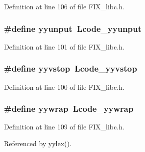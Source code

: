 Definition at line 106 of file FIX\_\-libc.h.
\subsubsection{\setlength{\rightskip}{0pt plus 5cm}\#define yyunput~Lcode\_\-yyunput}\label{FIX__libc_8h_5932d5d9168145d7af38eb53eb894347}




Definition at line 101 of file FIX\_\-libc.h.
\subsubsection{\setlength{\rightskip}{0pt plus 5cm}\#define \bf{yyvstop}~Lcode\_\-yyvstop}\label{FIX__libc_8h_9ca02f47c15552d622ca2eb1861eae31}




Definition at line 100 of file FIX\_\-libc.h.
\subsubsection{\setlength{\rightskip}{0pt plus 5cm}\#define yywrap~Lcode\_\-yywrap}\label{FIX__libc_8h_5be541efdb129f7cefb2437f52fe7359}




Definition at line 109 of file FIX\_\-libc.h.

Referenced by yylex().